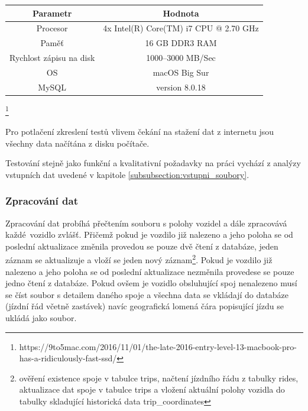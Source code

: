 \begin{center}
	\begin{table}[ht]
\centering
\begin{tabular}{|c|c|}
\hline
 Parametr & Hodnota \\ \hline \hline
 Procesor & 4x Intel(R) Core(TM) i7 CPU @ 2.70 GHz\\ \hline
 Paměť & 16 GB DDR3 RAM  \\  \hline
 Rychlost zápisu na disk & 1000--3000 MB/Sec \\ \hline
 OS & macOS Big Sur\\ \hline
 MySQL & version 8.0.18\\ \hline
\end{tabular}
\label{table:hw}
\end{table}
\end{center}
\footnote{https://9to5mac.com/2016/11/01/the-late-2016-entry-level-13-macbook-pro-has-a-ridiculously-fast-ssd/}

\bigbreak

Pro potlačení zkreslení testů vlivem čekání na stažení dat z internetu jsou všechny data načítána z disku počítače.

\bigbreak

Testování stejně jako funkční a kvalitativní požadavky na práci vychází z analýzy vstupních dat uvedené v kapitole \ref{subsubsection:vstupni_soubory}.

\subsubsection{Zpracování dat}

Zpracování dat probíhá přečtením souboru s polohy vozidel a dále zpracovává každé vozidlo zvlášť. Přičemž pokud je vozdilo již nalezeno a jeho poloha se od poslední aktualizace změnila provedou se pouze dvě čtení z databáze, jeden záznam se aktualizuje a vloží se jeden nový záznam\footnote{ověření existence spoje v tabulce trips, načtení jízdního řádu z tabulky rides, aktualizace dat spoje v tabulce trips a vložení aktuální polohy vozidla do tabulky skladující historická data trip\_coordinates}. Pokud je vozdilo již nalezeno a jeho poloha se od poslední aktualizace nezměnila provedese se pouze jedno čtení z databáze. Pokud ovšem je vozidlo obsluhující spoj nenalezeno musí se číst soubor s detailem daného spoje a všechna data se vkládají do databáze (jízdní řád včetně zastávek) navíc geografická lomená čára popisující jízdu se ukládá jako soubor.

\bigbreak

